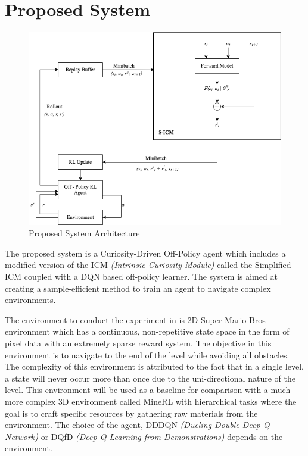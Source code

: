\documentclass[12pt,a4paper]{article}
\begin{document}
\section{Proposed System}

\begin{figure}[H]
  \centering
  \includegraphics[scale=0.60]{review-0-architecture.png}
  \caption{Proposed System Architecture}
  \label{fig:proposed-system}
\end{figure}

The proposed system is a Curiosity-Driven Off-Policy agent which includes a modified version
of the ICM \textit{(Intrinsic Curiosity Module)} called the Simplified-ICM \cite{cdl2} coupled with a 
DQN based off-policy learner. The system is aimed at creating a sample-efficient method to train an agent to
navigate complex environments.

The environment to conduct the experiment in is 2D Super Mario Bros environment which has a continuous, non-repetitive state space in the form of pixel data with an 
extremely sparse reward system. The objective in this environment is to navigate to the 
end of the level while avoiding all obstacles. The complexity of this environment is attributed
to the fact that in a single level, a state will never occur more than once due to the
uni-directional nature of the level. This environment will be used as a baseline for comparison
with a much more complex 3D environment called MineRL with hierarchical tasks where the 
goal is to craft specific resources by gathering raw materials from the environment. The choice of the agent, 
DDDQN \textit{(Dueling Double Deep Q-Network)} \cite{duel}\cite{double} or DQfD \textit{(Deep Q-Learning from Demonstrations)} 
depends on the environment.
\end{document}
